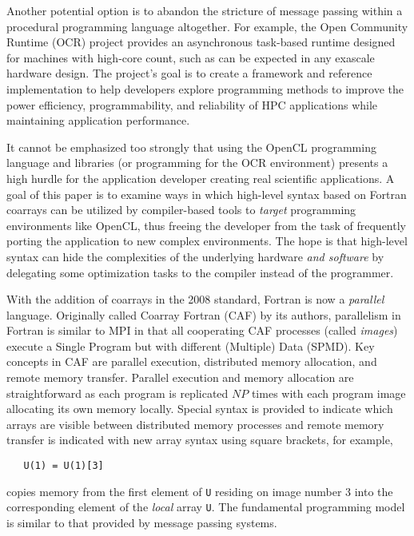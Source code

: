 Another potential option is to abandon the stricture of message passing within a procedural
programming language altogether.  For example, the Open Community Runtime (OCR)
project\cite{OCR:wiki:url} provides an asynchronous task-based runtime designed for
machines with high-core count\cite{Dokulil20151453}, such as can be expected in any
exascale hardware design.  The project's goal is to create a framework and reference
implementation to help developers explore programming methods to improve the power
efficiency, programmability, and reliability of HPC applications while maintaining
application performance.

\begin{comment}
OCR helps the application developer with the complex process of writing multi-core
applications.  It does this by providing facilities for creating and executing a set of
tasks.  The OCR runtime schedules the execution of these tasks based on events which
embody dataflow and code flow dependencies; when all of the dependencies for a task are
satisfied, the task can be run.
\end{comment}

It cannot be emphasized too strongly that using the OpenCL programming language and
libraries (or programming for the OCR environment) presents a high hurdle for the
application developer creating real scientific applications.  A goal of this paper is to
examine ways in which high-level syntax based on Fortran coarrays can be utilized by
compiler-based tools to \emph{target} programming environments like OpenCL, thus
freeing the developer from the task of frequently porting the application to new complex
environments.  The hope is that high-level syntax can hide the complexities of the
underlying hardware \emph{and software} by delegating some optimization tasks to the
compiler instead of the programmer.


With the addition of coarrays in the 2008 standard, Fortran is now a \emph{parallel}
language.  Originally called Coarray Fortran (CAF) by its
authors\cite{Numrich:1998:CFP:289918.289920}, parallelism in Fortran is similar to MPI in
that all cooperating CAF processes (called \emph{images}) execute a Single Program but with
different (Multiple) Data (SPMD).  Key concepts in CAF are parallel execution, distributed
memory allocation, and remote memory transfer.  Parallel execution and memory allocation
are straightforward as each program is replicated $NP$ times with each program image
allocating its own memory locally.  Special syntax is provided to indicate which arrays
are visible between distributed memory processes and remote memory transfer is indicated
with new array syntax using square brackets, for example,
\begin{verbatim}
   U(1) = U(1)[3]
\end{verbatim}
copies memory from the first element of \texttt{U} residing on image number 3 into
the corresponding element of the \emph{local} array \texttt{U}.  The fundamental programming
model is similar to that provided by message passing systems.

